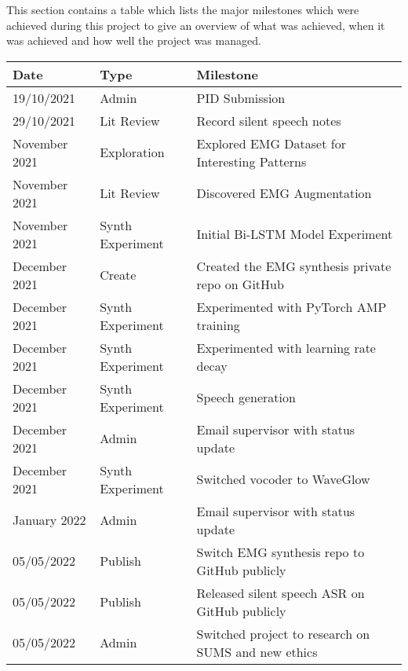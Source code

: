 This section contains a table which lists the major milestones which were
achieved during this project to give an overview of what was achieved, when it was
achieved and how well the project was managed.

{\small\begin{center}
    \begin{tabularx}{\textwidth}{ l l l }
        Date & Type & Milestone \\
        \hline
        19/10/2021 & Admin & PID Submission \\
        29/10/2021 & Lit Review & Record silent speech notes \\
        November 2021 & Exploration & Explored EMG Dataset for Interesting Patterns \\
        November 2021 & Lit Review & Discovered EMG Augmentation \\
        November 2021 & Synth Experiment & Initial Bi-LSTM Model Experiment \\
        December 2021 & Create & Created the EMG synthesis private repo on GitHub \\
        December 2021 & Synth Experiment & Experimented with PyTorch AMP training \\
        December 2021 & Synth Experiment & Experimented with learning rate decay \\
        December 2021 & Synth Experiment & Speech generation \\
        December 2021 & Admin & Email supervisor with status update \\
        December 2021 & Synth Experiment & Switched vocoder to WaveGlow \\
        January 2022 & Admin & Email supervisor with status update \\
        05/05/2022 & Publish & Switch EMG synthesis repo to GitHub publicly \\
        05/05/2022 & Publish & Released silent speech ASR on GitHub publicly \\
        05/05/2022 & Admin & Switched project to research on SUMS and new ethics
    \end{tabularx}
\end{center}}